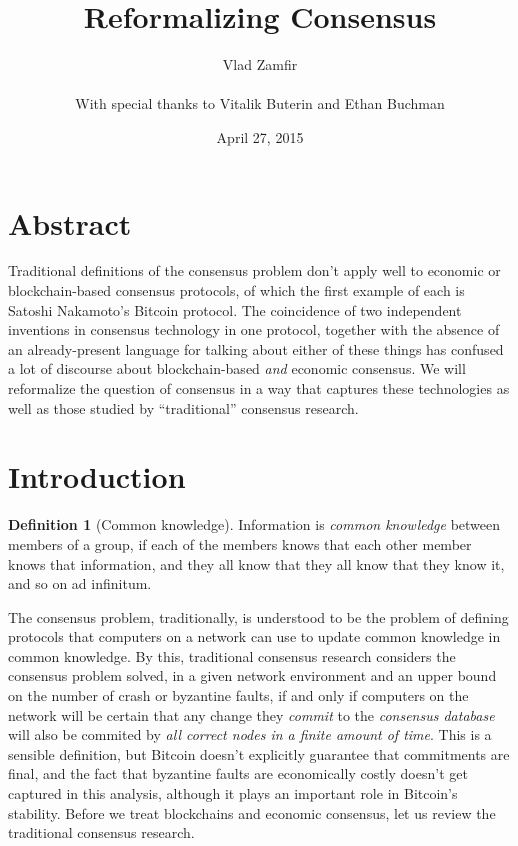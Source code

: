 \documentclass[11pt,a4paper]{article}
\title{Reformalizing Consensus}
\date{April 27, 2015}
\author{Vlad Zamfir\\
 			\\
 			\small With special thanks to Vitalik Buterin and Ethan Buchman}
\theoremstyle{plain}
\theoremstyle{definition}
\newtheorem{defn}{Definition}
\begin{document}
\maketitle
\tableofcontents


\section{Abstract}

Traditional definitions of the consensus problem don't apply well to economic or blockchain-based consensus protocols, of which the first example of each is Satoshi Nakamoto's Bitcoin protocol. The coincidence of two independent inventions in consensus technology in one protocol, together with the absence of an already-present language for talking about either of these things has confused a lot of discourse about blockchain-based \emph{and} economic consensus. We will reformalize the question of consensus in a way that captures these technologies as well as those studied by ``traditional'' consensus research.

\vspace{0.5cm}


\section{Introduction}

\begin{defn}[Common knowledge]
Information is \emph{common knowledge} between members of a group, if each of the members knows that each other member knows that information, and they all know that they all know that they know it, and so on ad infinitum.
\end{defn}

The consensus problem, traditionally, is understood to be the problem of defining protocols that computers on a network can use to update common knowledge in common knowledge. By this, traditional consensus research considers the consensus problem solved, in a given network environment and an upper bound on the number of crash or byzantine faults, if and only if computers on the network will be certain that any change they \emph{commit} to the \emph{consensus database} will also be commited by \emph{all correct nodes in a finite amount of time}. This is a sensible definition, but Bitcoin doesn't explicitly guarantee that commitments are final, and the fact that byzantine faults are economically costly doesn't get captured in this analysis, although it plays an important role in Bitcoin's stability. Before we treat blockchains and economic consensus, let us review the traditional consensus research.
\end{document}

